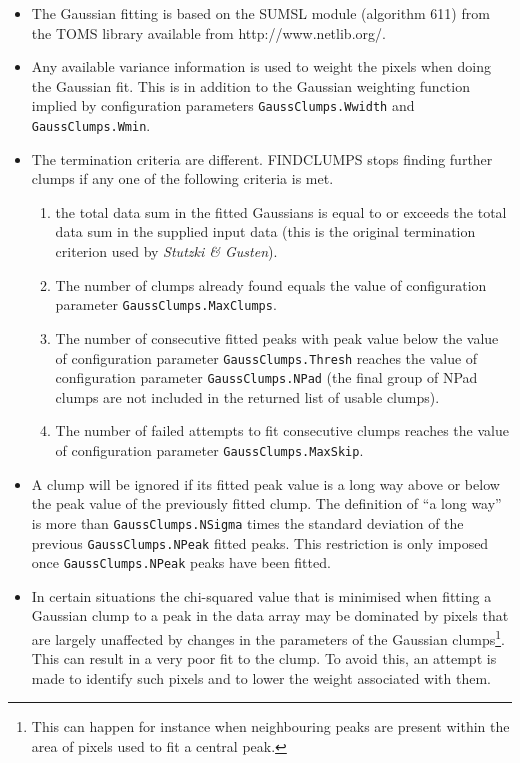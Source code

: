 \documentclass[twoside,11pt]{article}
\newcommand{\htmladdnormallink}[2]{#1}
\renewcommand{\_}{\texttt{\symbol{95}}}
\begin{document}
\begin{itemize}

\item The Gaussian fitting is based on the SUMSL module (algorithm 611)
from the TOMS library available from
\htmladdnormallink{http://www.netlib.org/}{{\tt http://www.netlib.org/}}.

\item Any available variance information is used to weight the pixels
when doing the Gaussian fit. This is in addition to the Gaussian
weighting function implied by configuration parameters
{\tt GaussClumps.Wwidth} and {\tt GaussClumps.Wmin}.

\item The termination criteria are different. FINDCLUMPS stops finding
further clumps if any one of the following criteria is met.

\begin{enumerate}

\item the total data sum in the fitted Gaussians is equal to or exceeds
the total data sum in the supplied input data (this is the original
termination criterion used by \emph{Stutzki \& Gusten}).

\item The number of clumps already found equals the value of
configuration parameter {\tt GaussClumps.MaxClumps}.

\item The number of consecutive fitted peaks with peak value below the
value of configuration parameter {\tt GaussClumps.Thresh} reaches the value of
configuration parameter {\tt GaussClumps.NPad} (the final group of NPad clumps
are not included in the returned list of usable clumps).

\item The number of failed attempts to fit consecutive clumps reaches
the value of configuration parameter {\tt GaussClumps.MaxSkip}.

\end{enumerate}

\item A clump will be ignored if its fitted peak value is a long way above or
below the peak value of the previously fitted clump. The definition of
``a long way'' is more than {\tt GaussClumps.NSigma} times the standard
deviation of the previous {\tt GaussClumps.NPeak} fitted peaks. This
restriction is only imposed once {\tt GaussClumps.NPeak} peaks have been
fitted.

\item In certain situations the chi-squared value that is minimised when
fitting a Gaussian clump to a peak in the data array may be dominated by
pixels that are largely unaffected by changes in the parameters of the
Gaussian clumps\footnote{This can happen for instance when neighbouring
peaks are present within the area of pixels used to fit a central peak.}.
This can result in a very poor fit to the clump. To avoid this, an attempt
is made to identify such pixels and to lower the weight associated with
them.

\end{itemize}
\end{document}
